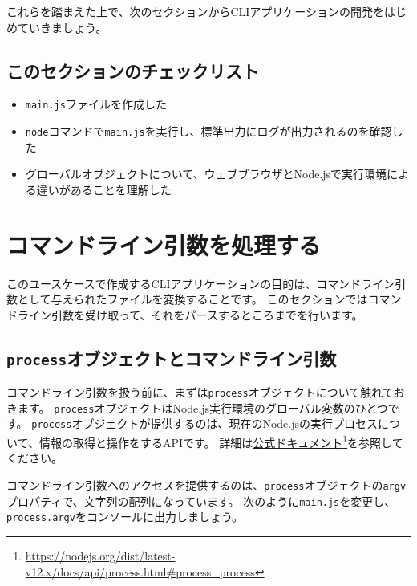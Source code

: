 これらを踏まえた上で、次のセクションからCLIアプリケーションの開発をはじめていきましょう。

\hypertarget{section-checklist}{%
\subsection{このセクションのチェックリスト}\label{section-checklist}}

\begin{itemize}
\item
  \texttt{main.js}ファイルを作成した
\item
  \texttt{node}コマンドで\texttt{main.js}を実行し、標準出力にログが出力されるのを確認した
\item
  グローバルオブジェクトについて、ウェブブラウザとNode.jsで実行環境による違いがあることを理解した
\end{itemize}

\hypertarget{processing-commandline-args}{%
\section{コマンドライン引数を処理する}\label{processing-commandline-args}}

このユースケースで作成するCLIアプリケーションの目的は、コマンドライン引数として与えられたファイルを変換することです。
このセクションではコマンドライン引数を受け取って、それをパースするところまでを行います。

\hypertarget{process-object-and-commandline-args}{%
\subsection{\texorpdfstring{\texttt{process}オブジェクトとコマンドライン引数}{processオブジェクトとコマンドライン引数}}\label{process-object-and-commandline-args}}

コマンドライン引数を扱う前に、まずは\texttt{process}オブジェクトについて触れておきます。
\texttt{process}オブジェクトはNode.js実行環境のグローバル変数のひとつです。
\texttt{process}オブジェクトが提供するのは、現在のNode.jsの実行プロセスについて、情報の取得と操作をするAPIです。
詳細は\href{https://nodejs.org/dist/latest-v12.x/docs/api/process.html\#process_process}{公式ドキュメント}\footnote{\url{https://nodejs.org/dist/latest-v12.x/docs/api/process.html\#process_process}}を参照してください。

コマンドライン引数へのアクセスを提供するのは、\texttt{process}オブジェクトの\texttt{argv}プロパティで、文字列の配列になっています。
次のように\texttt{main.js}を変更し、\texttt{process.argv}をコンソールに出力しましょう。

